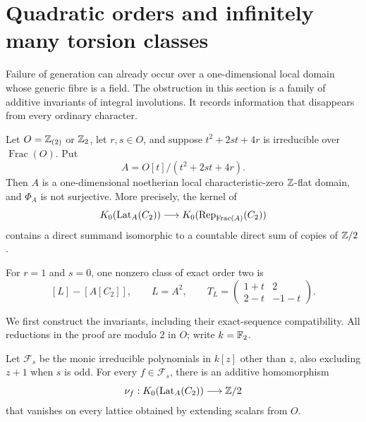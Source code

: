 \section{Quadratic orders and infinitely many torsion classes}
\label{sec:singular-orders}

Failure of generation can already occur over a one-dimensional local
domain whose generic fibre is a field.  The obstruction in this section
is a family of additive invariants of integral involutions.  It records
information that disappears from every ordinary character.

\begin{theorem}\label{thm:singular-order}
Let $O=\mathbb Z_{(2)}$ or $\mathbb Z_2$, let $r,s\in O$, and suppose
$t^2+2st+4r$ is irreducible over $\operatorname{Frac}(O)$.  Put
\[
 A=O[t]/(t^2+2st+4r).
\]
Then $A$ is a one-dimensional noetherian local characteristic-zero
$\mathbb Z$-flat domain, and $\Phi_A$ is not surjective.  More precisely, the
kernel of
\[
 K_0(\operatorname{Lat}_A(C_2))\longrightarrow
 K_0(\operatorname{Rep}_{\operatorname{Frac}(A)}(C_2))
\]
contains a direct summand isomorphic to a countable direct sum of
copies of $\mathbb Z/2$.
\end{theorem}

For $r=1$ and $s=0$, one nonzero class of exact order two is
\[
 [L]-[A[C_2]],\qquad L=A^2,\qquad
 T_L=\begin{pmatrix}1+t&2\\2-t&-1-t\end{pmatrix}.
\]


We first construct the invariants, including their exact-sequence
compatibility.  All reductions in the proof are modulo $2$ in $O$;
write $k=\mathbb F_2$.

\begin{lemma}\label{lem:order-detectors}
Let $\mathcal F_s$ be the monic irreducible polynomials in $k[z]$
other than $z$, also excluding $z+1$ when $s$ is odd.  For every
$f\in\mathcal F_s$, there is an
additive homomorphism
\[
 \nu_f:K_0(\operatorname{Lat}_A(C_2))\longrightarrow\mathbb Z/2
\]
that vanishes on every lattice obtained by extending scalars from $O$.
\end{lemma}

